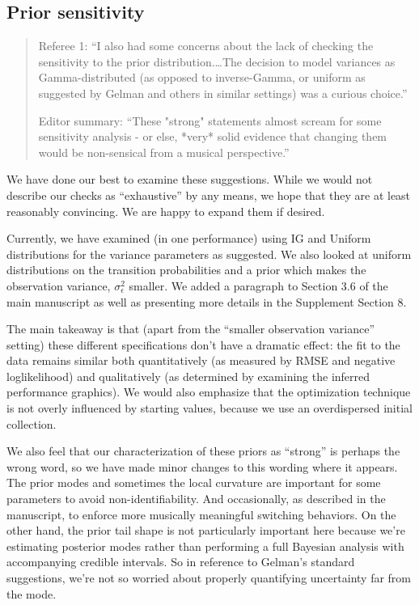 \documentclass[12pt]{article}
\newenvironment{resp}{\color{cobalt}}{}
\begin{document}
\subsection*{Prior sensitivity}

\begin{quote}
  Referee 1: ``I also had some concerns about the lack of checking the sensitivity to the prior distribution.\ldots The decision to model variances as Gamma-distributed (as opposed to inverse-Gamma, or uniform as suggested by Gelman and others in similar settings) was a curious choice.''

  Editor summary: ``These "strong" statements almost scream
for some sensitivity analysis - or else, *very* solid evidence that
changing them would be non-sensical from a musical perspective.''
\end{quote}

\begin{resp}
  We have done our best to examine these suggestions. While we would not describe our checks as ``exhaustive'' by any means, we hope that they are at least reasonably convincing. We are happy to expand them if desired.

  Currently, we have examined (in one performance) using IG and Uniform distributions for the variance parameters as suggested. We also looked at uniform distributions on the transition probabilities and a prior which makes the observation variance, $\sigma^2_\epsilon$ smaller. We added a paragraph to Section 3.6 of the main manuscript as well as presenting more details in the Supplement Section 8.

  The main takeaway is that (apart from the ``smaller observation variance'' setting) these different specifications don't have a dramatic effect: the fit to the data remains similar both quantitatively (as measured by RMSE and negative loglikelihood) and qualitatively (as determined by examining the inferred performance graphics). We would also emphasize that the optimization technique is not overly influenced by starting values, because  we  use an overdispersed initial collection.

  We also feel that our characterization of these priors as ``strong'' is perhaps the wrong word, so we have made minor changes to this wording where it appears. The prior modes and sometimes the local curvature are important for some parameters to avoid non-identifiability. And occasionally, as described in the manuscript, to enforce more musically meaningful switching behaviors. On the other hand, the prior tail shape is not particularly important here because we're estimating posterior modes rather than performing a full Bayesian analysis with accompanying credible intervals. So in reference to Gelman's standard suggestions, we're not so worried about properly quantifying uncertainty far from the mode.
\end{resp}
\end{document}
